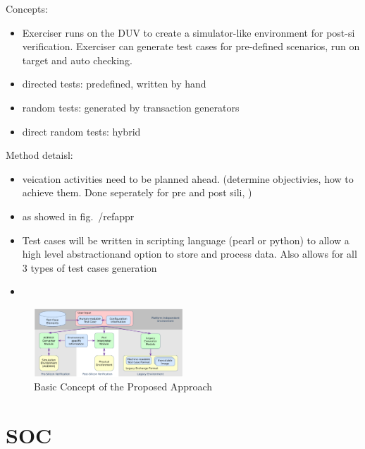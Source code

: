 \documentclass[conference]{IEEEtran}
\begin{document}
Concepts: 
\begin{itemize}
\item Exerciser runs on the DUV to create a simulator-like environment for post-si verification. Exerciser can generate test cases for pre-defined scenarios, run on target and auto checking. 
\item directed tests: predefined, written by hand
\item random tests: generated by transaction generators
\item direct random tests: hybrid
\end{itemize}

Method detaisl: 
\begin{itemize}
\item veication activities need to be planned ahead. (determine objectivies, how to achieve them. Done seperately for pre and post sili, \color{red}{may cause problems})
\item as showed in fig.~/ref{appr}
\item Test cases will be written in scripting language (pearl or python) to allow a high level abstractionand option to store and process data. Also allows for all 3 types of test cases generation
\item 
\end{itemize}

\begin{figure}
 \caption{Basic Concept of the Proposed Approach}
\label{appr}
\centering
    \includegraphics[width=0.5\textwidth]{appr}
\end{figure}

\section{SOC}
\end{document}
